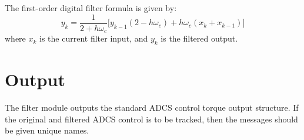 \documentclass[]{BasiliskReportMemo}
\begin{document}
The first-order digital filter formula is given by:
\begin{equation}
		y_{k} = \frac{1}{2+h \omega_{c}}
		\Big[
		y_{k-1} (2-h \omega_{c})  + h \omega_{c} (x_{k} + x_{k-1})
		\Big]
\end{equation}
where $x_{k}$ is the current filter input, and $y_{k}$ is the filtered output.


\section{Output}
The filter module outputs the standard ADCS control torque output structure.  If the original and filtered ADCS control is to be tracked, then the messages should be given unique names.




\end{document}
